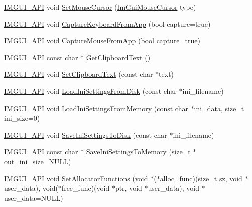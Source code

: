 \begin{DoxyCompactItemize}
\item 
\mbox{\hyperlink{imgui_8h_a43829975e84e45d1149597467a14bbf5}{I\+M\+G\+U\+I\+\_\+\+A\+PI}} void \mbox{\hyperlink{namespace_im_gui_ae212a3516efcba50a684df202c8e63ad}{Set\+Mouse\+Cursor}} (\mbox{\hyperlink{imgui_8h_a9223d6c82bb5d12c2eab5f829ca520ef}{Im\+Gui\+Mouse\+Cursor}} type)
\item 
\mbox{\hyperlink{imgui_8h_a43829975e84e45d1149597467a14bbf5}{I\+M\+G\+U\+I\+\_\+\+A\+PI}} void \mbox{\hyperlink{namespace_im_gui_af382f9360d73917a9e9c0d26b5797552}{Capture\+Keyboard\+From\+App}} (bool capture=true)
\item 
\mbox{\hyperlink{imgui_8h_a43829975e84e45d1149597467a14bbf5}{I\+M\+G\+U\+I\+\_\+\+A\+PI}} void \mbox{\hyperlink{namespace_im_gui_a3a86fbf0d334b30dc16fb44955f1ce54}{Capture\+Mouse\+From\+App}} (bool capture=true)
\item 
\mbox{\hyperlink{imgui_8h_a43829975e84e45d1149597467a14bbf5}{I\+M\+G\+U\+I\+\_\+\+A\+PI}} const char $\ast$ \mbox{\hyperlink{namespace_im_gui_a11837daee819fd90e17d80ab1eef1f99}{Get\+Clipboard\+Text}} ()
\item 
\mbox{\hyperlink{imgui_8h_a43829975e84e45d1149597467a14bbf5}{I\+M\+G\+U\+I\+\_\+\+A\+PI}} void \mbox{\hyperlink{namespace_im_gui_aa4824a1b351c063b4aff9b9f4fb5fd4d}{Set\+Clipboard\+Text}} (const char $\ast$text)
\item 
\mbox{\hyperlink{imgui_8h_a43829975e84e45d1149597467a14bbf5}{I\+M\+G\+U\+I\+\_\+\+A\+PI}} void \mbox{\hyperlink{namespace_im_gui_a4bf22fb84ba768fc18383af50e8c217f}{Load\+Ini\+Settings\+From\+Disk}} (const char $\ast$ini\+\_\+filename)
\item 
\mbox{\hyperlink{imgui_8h_a43829975e84e45d1149597467a14bbf5}{I\+M\+G\+U\+I\+\_\+\+A\+PI}} void \mbox{\hyperlink{namespace_im_gui_a8e37b6a0b2feb6cd6ac61a4259392861}{Load\+Ini\+Settings\+From\+Memory}} (const char $\ast$ini\+\_\+data, size\+\_\+t ini\+\_\+size=0)
\item 
\mbox{\hyperlink{imgui_8h_a43829975e84e45d1149597467a14bbf5}{I\+M\+G\+U\+I\+\_\+\+A\+PI}} void \mbox{\hyperlink{namespace_im_gui_afa4985e7810be4e687bc4ff28cec8a4d}{Save\+Ini\+Settings\+To\+Disk}} (const char $\ast$ini\+\_\+filename)
\item 
\mbox{\hyperlink{imgui_8h_a43829975e84e45d1149597467a14bbf5}{I\+M\+G\+U\+I\+\_\+\+A\+PI}} const char $\ast$ \mbox{\hyperlink{namespace_im_gui_a27043a530e0e842e01c279dd4207f9eb}{Save\+Ini\+Settings\+To\+Memory}} (size\+\_\+t $\ast$out\+\_\+ini\+\_\+size=N\+U\+LL)
\item 
\mbox{\hyperlink{imgui_8h_a43829975e84e45d1149597467a14bbf5}{I\+M\+G\+U\+I\+\_\+\+A\+PI}} void \mbox{\hyperlink{namespace_im_gui_aa06dc28aca85fb0f38edd2c9e639f03f}{Set\+Allocator\+Functions}} (void $\ast$($\ast$alloc\+\_\+func)(size\+\_\+t sz, void $\ast$user\+\_\+data), void($\ast$free\+\_\+func)(void $\ast$ptr, void $\ast$user\+\_\+data), void $\ast$user\+\_\+data=N\+U\+LL)

\end{DoxyCompactItemize}
